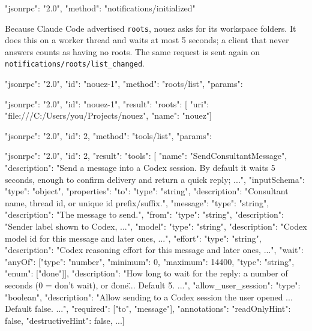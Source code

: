 \documentclass[10pt,a4paper]{article}
\newcommand{\code}[1]{\texttt{#1}}
\begin{document}
\begin{wire}
{"jsonrpc": "2.0", "method": "notifications/initialized"}
\end{wire}

Because Claude Code advertised \code{roots}, nouez asks for its workspace folders. It does this on
a worker thread and waits at most 5 seconds; a client that never answers counts as having no
roots. The same request is sent again on \code{notifications/roots/list\_changed}.

\begin{wire}
{"jsonrpc": "2.0", "id": "nouez-1", "method": "roots/list", "params": {}}
\end{wire}
\begin{wire}
{"jsonrpc": "2.0", "id": "nouez-1", "result": {"roots": [
  {"uri": "file:///C:/Users/you/Projects/nouez", "name": "nouez"}]}}
\end{wire}

\begin{wire}
{"jsonrpc": "2.0", "id": 2, "method": "tools/list", "params": {}}
\end{wire}
\begin{wire}
{"jsonrpc": "2.0", "id": 2, "result": {"tools": [
  {"name": "SendConsultantMessage",
   "description": "Send a message into a Codex session. By default it waits 5 seconds, enough to confirm delivery and return a quick reply; ...",
   "inputSchema": {"type": "object",
     "properties": {
       "to": {"type": "string", "description": "Consultant name, thread id, or unique id prefix/suffix."},
       "message": {"type": "string", "description": "The message to send."},
       "from": {"type": "string", "description": "Sender label shown to Codex, ..."},
       "model": {"type": "string", "description": "Codex model id for this message and later ones, ..."},
       "effort": {"type": "string", "description": "Codex reasoning effort for this message and later ones, ..."},
       "wait": {"anyOf": [{"type": "number", "minimum": 0, "maximum": 14400},
                          {"type": "string", "enum": ["done"]}],
                "description": "How long to wait for the reply: a number of seconds (0 = don't wait), or \"done\" ... Default 5. ..."},
       "allow_user_session": {"type": "boolean", "description": "Allow sending to a Codex session the user opened ... Default false. ..."}},
     "required": ["to", "message"]},
   "annotations": {"readOnlyHint": false, "destructiveHint": false}},
  ...]}}
\end{wire}
\end{document}
